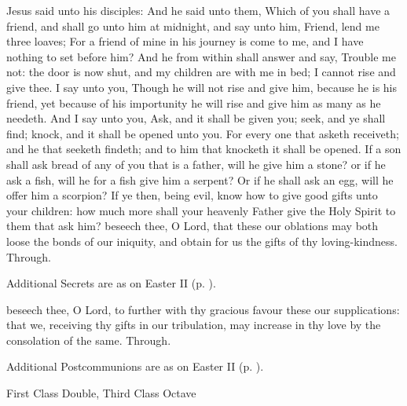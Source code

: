  Jesus said unto his disciples: And he said unto them, Which of you shall have a friend, and shall go unto him at midnight, and say unto him, Friend, lend me three loaves; For a friend of mine in his journey is come to me, and I have nothing to set before him? And he from within shall answer and say, Trouble me not: the door is now shut, and my children are with me in bed; I cannot rise and give thee. I say unto you, Though he will not rise and give him, because he is his friend, yet because of his importunity he will rise and give him as many as he needeth. And I say unto you, Ask, and it shall be given you; seek, and ye shall find; knock, and it shall be opened unto you. For every one that asketh receiveth; and he that seeketh findeth; and to him that knocketh it shall be opened. If a son shall ask bread of any of you that is a father, will he give him a stone? or if he ask a fish, will he for a fish give him a serpent? Or if he shall ask an egg, will he offer him a scorpion? If ye then, being evil, know how to give good gifts unto your children: how much more shall your heavenly Father give the Holy Spirit to them that ask him?
\secret
{} beseech thee, O Lord, that these our oblations may both loose the bonds of our iniquity, and obtain for us the gifts of thy loving-kindness. Through.
\begin{rubric}
    Additional Secrets are as on Easter II (p. \pageref{EasterIISecret}).
\end{rubric}
\postcommunion
{} beseech thee, O Lord, to further with thy gracious favour these our supplications: that we, receiving thy gifts in our tribulation, may increase in thy love by the consolation of the same. Through.
\begin{rubric}
    Additional Postcommunions are as on Easter II (p. \pageref{EasterIIPostcommunion}).
\end{rubric}

\begin{inhead}
    {First Class Double, Third Class Octave}
\end{inhead}
\par\noindent
{}

